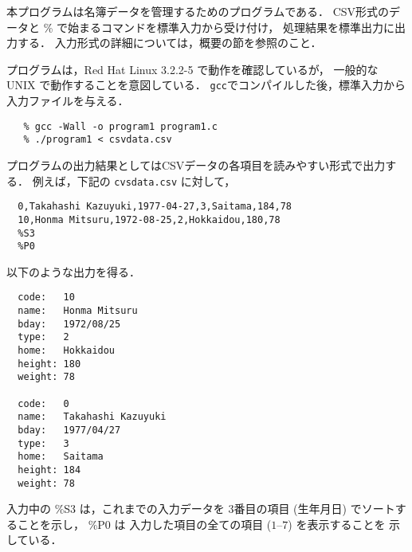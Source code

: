 \documentclass[a4j,11pt]{jarticle}
\begin{document}

本プログラムは名簿データを管理するためのプログラムである．
CSV形式のデータと \% で始まるコマンドを標準入力から受け付け，
処理結果を標準出力に出力する．
入力形式の詳細については，概要の節を参照のこと．

プログラムは，Red Hat Linux 3.2.2-5 で動作を確認しているが，
一般的な UNIX で動作することを意図している．
\verb|gcc|でコンパイルした後，標準入力から入力ファイルを与える．

{\fontsize{10pt}{11pt} \selectfont
 \begin{verbatim}
   % gcc -Wall -o program1 program1.c
   % ./program1 < csvdata.csv
 \end{verbatim}
}

プログラムの出力結果としてはCSVデータの各項目を読みやすい形式で出力する．
例えば，下記の \verb|cvsdata.csv| に対して，

{\fontsize{10pt}{11pt} \selectfont
 \begin{verbatim}
  0,Takahashi Kazuyuki,1977-04-27,3,Saitama,184,78
  10,Honma Mitsuru,1972-08-25,2,Hokkaidou,180,78
  %S3
  %P0
 \end{verbatim}
}

\noindent %
以下のような出力を得る．

{\fontsize{10pt}{11pt} \selectfont
 \begin{verbatim}
  code:   10
  name:   Honma Mitsuru
  bday:   1972/08/25
  type:   2
  home:   Hokkaidou
  height: 180
  weight: 78

  code:   0
  name:   Takahashi Kazuyuki
  bday:   1977/04/27
  type:   3
  home:   Saitama
  height: 184
  weight: 78
 \end{verbatim}
}

\noindent
入力中の
\%S3 は，これまでの入力データを
3番目の項目 (生年月日) でソートすることを示し，
\%P0 は 入力した項目の全ての項目 ($1$--$7$) を表示することを
示している．
\end{document}
